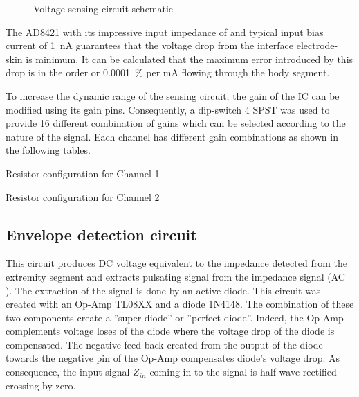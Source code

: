 \begin{figure}
	\label{fig:sensing}
	\caption{Voltage sensing circuit schematic}
\end{figure}

The AD8421\cite{ad:AD8421} with its impressive input impedance of  and typical input bias current of \SI{1}{\nA} guarantees that the voltage drop from the interface electrode-skin is minimum. It can be calculated that the maximum error introduced by this drop is in the order or \SI{0.0001}{\percent} per mA flowing through the body segment. 

To increase the dynamic range of the sensing circuit, the gain of the IC can be modified using its gain pins. Consequently, a dip-switch 4 SPST   was used to provide 16 different combination of gains which can be selected according to the nature of the signal. Each channel has different gain combinations as shown in the following tables.

\begin{table}
	\label{tbl:rch1}
	\caption{Resistor configuration for Channel 1}
\end{table} 

\begin{table}
	\label{tbl:rch2}
	\caption{Resistor configuration for Channel 2}
\end{table} 


\subsection{Envelope detection circuit}
This circuit produces DC  voltage equivalent to the impedance detected from the extremity segment and extracts pulsating signal from the impedance signal (AC ). The extraction of the signal is done by an active diode. This circuit was created with an Op-Amp TL08XX\cite{ti:TL08xx} and a diode 1N4148. The combination of these two components create a ''super diode'' or ''perfect diode''. Indeed, the Op-Amp complements voltage loses of the diode where the voltage drop of the diode is compensated. The negative feed-back created from the output of the diode towards the negative pin of the Op-Amp compensates diode's voltage drop. As consequence, the input signal $Z_{in}$ coming in to the signal is half-wave rectified crossing by zero. 

